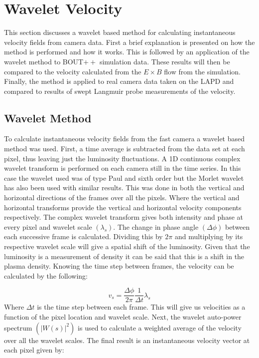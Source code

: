 \documentclass{jpp}
\providecommand\upi{\pi}%
\providecommand\upi{\pi}%
\begin{document}
\section{Wavelet Velocity}

This section discusses a wavelet based method \citep{chaston10} for calculating instantaneous velocity fields from camera data. First a brief explanation is presented on how the method is performed and how it works. This is followed by an application of the wavelet method to BOUT$++$ simulation data. These results will then be compared to the velocity calculated from the $E \times B$ flow from the simulation. Finally, the method is applied to real camera data taken on the LAPD and compared to results of swept Langmuir probe measurements of the velocity.



\subsection{Wavelet Method}

To calculate instantaneous velocity fields from the fast camera a wavelet based method was used. First, a time average is subtracted from the data set at each pixel, thus leaving just the luminosity fluctuations. A 1D continuous complex wavelet transform is performed on each camera still in the time series. In this case the wavelet used was of type Paul and sixth order but the Morlet wavelet has also been used with similar results. This was done in both the vertical and horizontal directions of the frames over all the pixels. Where the vertical and horizontal transforms provide the vertical and horizontal velocity components respectively. The complex wavelet transform gives both intensity and phase at every pixel and wavelet scale $(\lambda_s)$. The change in phase angle $(\Delta\phi)$ between each successive frame is calculated. Dividing this by $2\pi$ and multiplying by its respective wavelet scale will give a spatial shift of the luminosity. Given that the luminosity is a measurement of density it can be said that this is a shift in the plasma density. Knowing the time step between frames, the velocity can be calculated by the following:

\begin{equation} v_s=\frac{\Delta\phi}{2\upi}\frac{1}{\Delta t}\lambda_s
\label{eq:two}
\end{equation}
Where $\Delta t$ is the time step between each frame. This will give us velocities as a function of the pixel location and wavelet scale. Next, the wavelet auto-power spectrum $(\vert W(s) \vert^2)$ is used to calculate a weighted average of the velocity over all the wavelet scales. The final result is an instantaneous velocity vector at each pixel given by:
\end{document}
